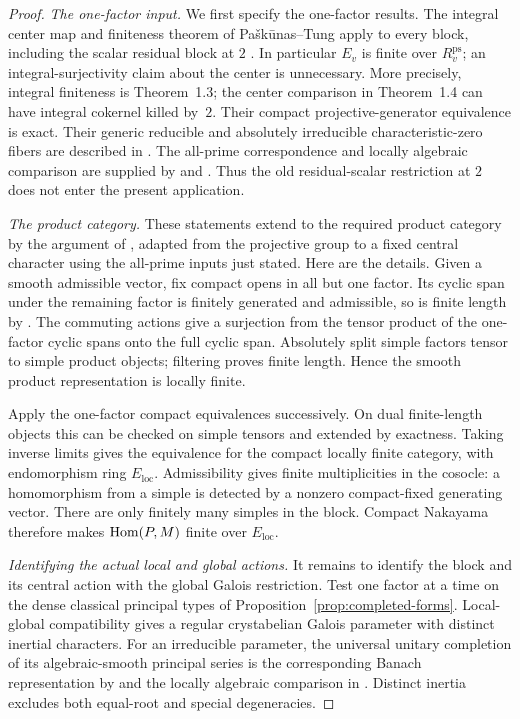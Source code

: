\begin{proof}
\emph{The one-factor input.}
We first specify the one-factor results.
The integral center map and finiteness theorem of
Pa\v{s}k\=unas--Tung apply to every block, including the
scalar residual block at \(2\)
\cite[Theorems~1.1--1.4]{PaskunasTung2021}.
In particular \(E_v\) is finite over \(R_v^{\mathrm{ps}}\);
an integral-surjectivity claim about the center is
unnecessary. More precisely, integral finiteness is Theorem~1.3;
the center comparison in Theorem~1.4 can have integral cokernel killed
by~\(2\). Their compact projective-generator
equivalence is exact. Their generic reducible and
absolutely irreducible characteristic-zero fibers are
described in \cite[Corollary~6.10 and
Proposition~6.11]{PaskunasTung2021}.
The all-prime correspondence and locally algebraic
comparison are supplied by
\cite[Theorems~1.1 and 1.3]{CDP2014} and
\cite[Theorem~0.20]{Colmez2010}.
Thus the old residual-scalar restriction at \(2\) does not
enter the present application.

\emph{The product category.}
These statements extend to the required product category
by the argument of \cite[Lemmas~B.7--B.8]{GeeNewton2022},
adapted from the projective group to a fixed central
character using the all-prime inputs just stated.
Here are the details. Given a smooth admissible vector, fix compact
opens in all but one factor. Its cyclic span under the
remaining factor is finitely generated and admissible,
so is finite length by
\cite[Lemma~2.3.6 and Theorem~2.3.8]{Emerton2010OrdinaryI}.
The commuting actions give a surjection from the tensor
product of the one-factor cyclic spans onto the full
cyclic span. Absolutely split simple factors tensor to
simple product objects; filtering proves finite length.
Hence the smooth product representation is locally finite.

Apply the one-factor compact equivalences successively.
On dual finite-length objects this can be checked on simple
tensors and extended by exactness. Taking inverse limits
gives the equivalence for the compact locally finite
category, with endomorphism ring \(E_{\mathrm{loc}}\).
Admissibility gives finite multiplicities in the cosocle:
a homomorphism from a simple is detected by a nonzero
compact-fixed generating vector. There are only finitely
many simples in the block. Compact Nakayama therefore
makes \(\operatorname{Hom}(P,M)\) finite over \(E_{\mathrm{loc}}\).

\emph{Identifying the actual local and global actions.}
It remains to identify the block and its central action
with the global Galois restriction. Test one factor at a
time on the dense classical principal types of
Proposition~\ref{prop:completed-forms}. Local-global
compatibility gives a regular crystabelian Galois
parameter with distinct inertial characters.
For an irreducible parameter, the universal unitary
completion of its algebraic-smooth principal series is
the corresponding Banach representation by
\cite[Theorem~4.3.1 and Corollaries~5.3.1--5.3.4]{BergerBreuil2010}
and the locally algebraic comparison in \cite{CDP2014}.
Distinct inertia excludes both equal-root and special
degeneracies.


\end{proof}
